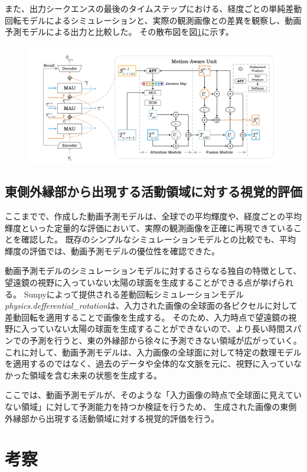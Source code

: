           また、出力シークエンスの最後のタイムステップにおける、経度ごとの単純差動回転モデルによるシミュレーションと、実際の観測画像との差異を観察し、動画予測モデルによる出力と比較した。
          その散布図を図\ref{fig:exp1_sdr_longitude_scatter}に示す。
          \begin{figure}[htbp]
            \centering
            \includegraphics[width=150mm]{figures/mau.png}
            \caption{}
            \label{fig:exp1_sdr_longitude_scatter}
          \end{figure}
    
    \subsection{東側外縁部から出現する活動領域に対する視覚的評価}
      ここまでで、作成した動画予測モデルは、全球での平均輝度や、経度ごとの平均輝度といった定量的な評価において、実際の観測画像を正確に再現できていることを確認した。
      既存のシンプルなシミュレーションモデルとの比較でも、平均輝度の評価では、動画予測モデルの優位性を確認できた。

      動画予測モデルのシミュレーションモデルに対するさらなる独自の特徴として、望遠鏡の視野に入っていない太陽の球面を生成することができる点が挙げられる。
      Sunpyによって提供される差動回転シミュレーションモデル\textit{physics.defferential\_rotation}は、入力された画像の全球面の各ピクセルに対して差動回転を適用することで画像を生成する。
      そのため、入力時点で望遠鏡の視野に入っていない太陽の球面を生成することができないので、より長い時間スパンでの予測を行うと、東の外縁部から徐々に予測できない領域が広がっていく。
      これに対して、動画予測モデルは、入力画像の全球面に対して特定の数理モデルを適用するのではなく、過去のデータや全体的な文脈を元に、視野に入っていなかった領域を含む未来の状態を生成する。
      
      ここでは、動画予測モデルが、そのような「入力画像の時点で全球面に見えていない領域」に対して予測能力を持つか検証を行うため、 生成された画像の東側外縁部から出現する活動領域に対する視覚的評価を行う。
      

  \section{考察}
